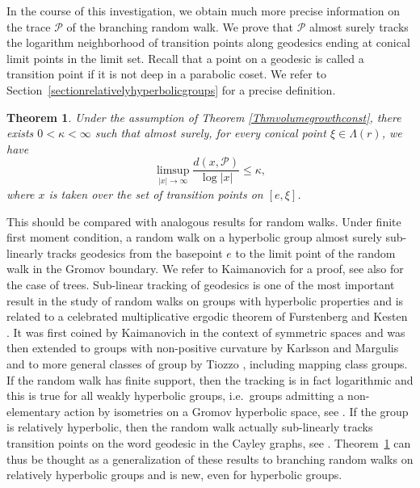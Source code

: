 \documentclass{amsart}
\newtheorem{thm}{Theorem}[section]
\theoremstyle{definition}
\theoremstyle{remark}
\begin{document}
In the course of this investigation, we obtain much more precise information on the trace $\mathcal{P}$ of the branching random walk.
We prove that $\mathcal{P}$ almost surely tracks the logarithm neighborhood of transition points along geodesics ending at conical limit points in the limit set.
Recall that a point on a geodesic is called a transition point if it is not deep in a parabolic coset.
We refer to Section~\ref{sectionrelativelyhyperbolicgroups} for a precise definition.

\begin{thm}\label{thmlogarithmictracking}
Under the assumption of Theorem \ref{Thmvolumegrowthconst}, {there exists $0 < \kappa < \infty$ such that} 
almost surely,  for every conical point $\xi\in \Lambda(r)$, we have
$$
\limsup_{|x|\to\infty} \frac{d(x,\mathcal P)}{\log |x|}\le \kappa, %
$$
where $x$ is taken over  the set of transition points on $[e,\xi]$.
\end{thm}

This should be compared with analogous results for random walks.
Under finite first moment condition, a random walk on a hyperbolic group almost surely sub-linearly tracks geodesics from the basepoint $e$ to the limit point of the random walk in the Gromov boundary.
We refer to  Kaimanovich \cite[Theorem~7.3]{Kaimanovich} for a proof, see also \cite{Ledrappier} for the case of trees.
Sub-linear tracking of geodesics is one of the most important result in the study of random walks on groups with hyperbolic properties and is related to a celebrated multiplicative ergodic theorem of Furstenberg and Kesten \cite{FurstenbergKesten}.
It was first coined by Kaimanovich in the context of symmetric spaces \cite{Kaimanovichsymmetricspaces} and was then extended to groups with non-positive curvature by Karlsson and Margulis \cite{KarlssonMargulis}
and to more general classes of group by Tiozzo \cite{Tiozzo}, including mapping class groups.
If the random walk has finite support, then the tracking is in fact logarithmic and this is true for all weakly hyperbolic groups, i.e.\ groups admitting a non-elementary action by isometries on a Gromov hyperbolic space, see \cite[Theorem~1.3]{MaherTiozzo}.
If the group is relatively hyperbolic, then the random walk actually sub-linearly tracks transition points on the word geodesic in the Cayley graphs, see \cite[Proposition~3.2]{DussauleYang}.
Theorem~\ref{thmlogarithmictracking} can thus be thought as a generalization of these results to branching random walks on relatively hyperbolic groups and is new, even for hyperbolic groups.
\end{document}
